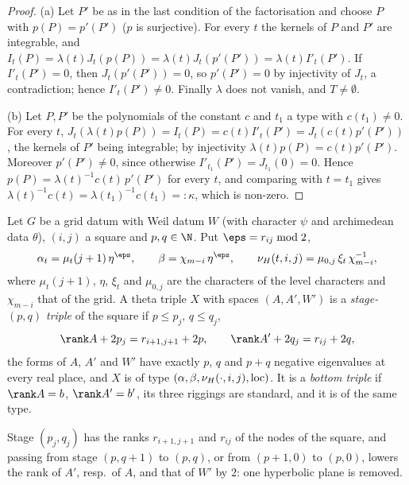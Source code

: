 \begin{proof}
(a) Let $P'$ be as in the last condition of the factorisation and choose $P$ with $p(P)=p'(P')$ ($p$ is surjective). For
every $t$ the kernels of $P$ and $P'$ are integrable, and
$I_t(P)=\lambda(t)J_t(p(P))=\lambda(t)J_t(p'(P'))=\lambda(t)I'_t(P')$. If $I'_t(P')=0$, then $J_t(p'(P'))=0$, so $p'(P')=0$
by injectivity of $J_t$, a contradiction; hence $I'_t(P')\ne0$. Finally $\lambda$ does not vanish, and $T\ne\emptyset$.

(b) Let $P,P'$ be the polynomials of the constant $c$ and $t_1$ a type with $c(t_1)\ne0$. For every $t$,
$J_t(\lambda(t)p(P))=I_t(P)=c(t)I'_t(P')=J_t(c(t)p'(P'))$, the kernels of $P'$ being integrable; by injectivity
$\lambda(t)p(P)=c(t)p'(P')$. Moreover $p'(P')\ne0$, since otherwise $I'_{t_1}(P')=J_{t_1}(0)=0$. Hence
$p(P)=\lambda(t)^{-1}c(t)\,p'(P')$ for every $t$, and comparing with $t=t_1$ gives
$\lambda(t)^{-1}c(t)=\lambda(t_1)^{-1}c(t_1)=:\kappa$, which is non-zero.
\end{proof}

\begin{definition}\label{pf:sh-theta:stage}
Let $G$ be a grid datum with Weil datum $W$ (with character $\psi$ and archimedean data $\theta$), $(i,j)$ a square
and $p,q\in\N$. Put $\eps=r_{ij}\bmod 2$,
\[
\alpha_t=\mu_t(j+1)\,\eta^{\eps},\qquad\beta=\chi_{m-i}\,\eta^{\eps},\qquad
\nu_H(t,i,j)=\mu_{0,j}\,\xi_t\,\chi_{m-i}^{-1},
\]
where $\mu_t(j+1)$, $\eta$, $\xi_t$ and $\mu_{0,j}$ are the characters of the level characters and $\chi_{m-i}$ that of
the grid. A theta triple $X$ with spaces $(A,A',W')$ is a \emph{stage-$(p,q)$ triple} of the square if $p\le p_j$,
$q\le q_j$,
\[
\rank A+2p_j=r_{i+1,j+1}+2p,\qquad\rank A'+2q_j=r_{ij}+2q,
\]
the forms of $A$, $A'$ and $W'$ have exactly $p$, $q$ and $p+q$ negative eigenvalues at every real place, and $X$ is of
type $(\alpha,\beta,\nu_H(\cdot,i,j),\mathrm{loc})$. It is a \emph{bottom triple} if $\rank A=b$, $\rank A'=b'$, its three
riggings are standard, and it is of the same type.
\end{definition}

Stage $(p_j,q_j)$ has the ranks $r_{i+1,j+1}$ and $r_{ij}$ of the nodes of the square, and passing from stage
$(p,q+1)$ to $(p,q)$, or from $(p+1,0)$ to $(p,0)$, lowers the rank of $A'$, resp.\ of $A$, and that of $W'$ by $2$: one
hyperbolic plane is removed.

